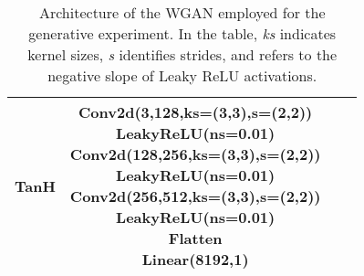 \documentclass[10pt,twocolumn,letterpaper]{article}
\begin{document}
\begin{table*}[t]
\begin{tabular}{lccc}
{TanH
}
&
\makecell{Conv2d(3,128,ks=(3,3),s=(2,2))\\
LeakyReLU(ns=0.01)\\
Conv2d(128,256,ks=(3,3),s=(2,2))\\
LeakyReLU(ns=0.01)\\
Conv2d(256,512,ks=(3,3),s=(2,2))\\
LeakyReLU(ns=0.01)\\
Flatten\\
Linear(8192,1)
}
\\\bottomrule
\end{tabular}
\caption{Architecture of the WGAN employed for the generative experiment. In the table, \textit{ks} indicates kernel sizes, \textit{s} identifies strides, and  refers to the negative slope of Leaky ReLU activations.}
\label{tab:wgan_arch}
\end{table*} 
\end{document}
